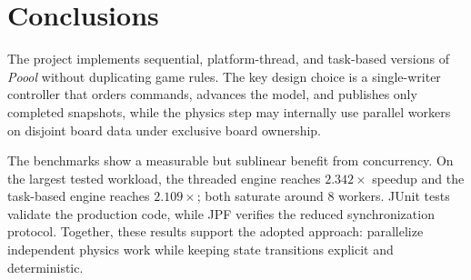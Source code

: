 \clearpage
\section{Conclusions}

The project implements sequential, platform-thread, and task-based versions of
\emph{Poool} without duplicating game rules. The key design choice is a
single-writer controller that orders commands, advances the model, and
publishes only completed snapshots, while the physics step may internally use
parallel workers on disjoint board data under exclusive board ownership.

The benchmarks show a measurable but sublinear benefit from concurrency. On the
largest tested workload, the threaded engine reaches $2.342\times$ speedup and
the task-based engine reaches $2.109\times$; both saturate around 8 workers.
JUnit tests validate the production code, while JPF verifies the reduced
synchronization protocol. Together, these results support the adopted approach:
parallelize independent physics work while keeping state transitions explicit
and deterministic.
